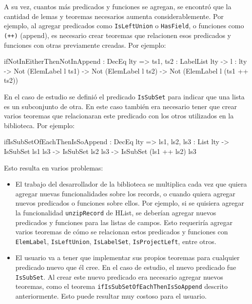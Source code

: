 A su vez, cuantos más predicados y funciones se agregan, se encontró que la cantidad de lemas y teoremas necesarios aumenta considerablemente. Por ejemplo, al agregar predicados como \texttt{IsLeftUnion} o \texttt{HasField}, o funciones como \texttt{(++)} (append), es necesario crear teoremas que relacionen esos predicados y funciones con otras previamente creadas. Por ejemplo:

\begin{code}
ifNotInEitherThenNotInAppend : DecEq lty => 
  {ts1, ts2 : LabelList lty} -> {l : lty} -> 
  Not (ElemLabel l ts1) -> Not (ElemLabel l ts2) -> 
  Not (ElemLabel l (ts1 ++ ts2))
\end{code}

En el caso de estudio se definió el predicado \texttt{IsSubSet} para indicar que una lista es un subconjunto de otra. En este caso también era necesario tener que crear varios teoremas que relacionaran este predicado con los otros utilizados en la biblioteca. Por ejemplo:

\begin{code}
ifIsSubSetOfEachThenIsSoAppend : DecEq lty => 
  {ls1, ls2, ls3 : List lty} -> 
  IsSubSet ls1 ls3 -> IsSubSet ls2 ls3 -> 
  IsSubSet (ls1 ++ ls2) ls3
\end{code}

Esto resulta en varios problemas:

\begin{itemize}
\item El trabajo del desarrollador de la biblioteca se multiplica cada vez que quiera agregar nuevas funcionalidades sobre los records, o cuando quiera agregar nuevos predicados o funciones sobre ellos. Por ejemplo, si se quisiera agregar la funcionalidad \texttt{unzipRecord} de HList, se deberían agregar nuevos predicados y funciones para las listas de campos. Esto requeriría agregar varios teoremas de cómo se relacionan estos predicados y funciones con \texttt{ElemLabel}, \texttt{IsLeftUnion}, \texttt{IsLabelSet}, \texttt{IsProjectLeft}, entre otros.
\item El usuario va a tener que implementar sus propios teoremas para cualquier predicado nuevo que él cree. En el caso de estudio, el nuevo predicado fue \texttt{IsSubSet}. Al crear este nuevo predicado era necesario agregar nuevos teoremas, como el teorema \texttt{ifIsSubSetOfEachThenIsSoAppend} descrito anteriormente. Esto puede resultar muy costoso para el usuario.
\end{itemize}


